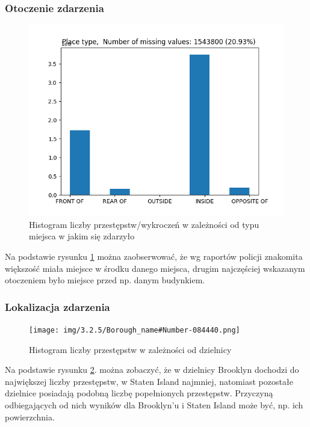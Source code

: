 \documentclass{classrep}
\begin{document}
{{            \subsubsection{Otoczenie zdarzenia} {
                \begin{figure}[!htbp]
                    \centering
                    \includegraphics[width=\textwidth]{img/Placetype-133640.png}
                    \caption{Histogram liczby przestępstw/wykroczeń w zależności od typu miejsca w jakim się zdarzyło}
                    \label{hist_place_type}
                \end{figure}
                \FloatBarrier
                Na podstawie rysunku \ref{hist_place_type} można zaobserwować, że wg raportów policji znakomita większość miała miejsce w środku danego miejsca, drugim najczęściej wskazanym otoczeniem było miejsce przed np. danym budynkiem.
            }

            \subsubsection{Lokalizacja zdarzenia} {
                \begin{figure}[!htbp]
                    \centering
                   \texttt{[image: img/3.2.5/Borough\_name\#Number-084440.png]}
                    \caption{Histogram liczby przestępstw w zależności od dzielnicy}
                    \label{borough_hist}
                \end{figure}
                \FloatBarrier
                Na podstawie rysunku \ref{borough_hist}. można zobaczyć, że w dzielnicy Brooklyn dochodzi do największej liczby przestępstw, w Staten Island najmniej, natomiast pozostałe dzielnice posiadają podobną liczbę popełnionych przestępstw. Przyczyną odbiegających od nich wyników dla Brooklyn'u i Staten Island może być, np. ich powierzchnia.
            }

}}
\end{document}
